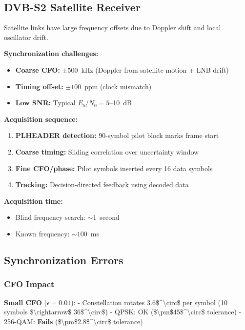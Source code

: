 \subsection{DVB-S2 Satellite Receiver}

Satellite links have large frequency offsets due to Doppler shift and local oscillator drift.

\textbf{Synchronization challenges:}
\begin{itemize}
\item \textbf{Coarse CFO:} $\pm 500$~kHz (Doppler from satellite motion + LNB drift)
\item \textbf{Timing offset:} $\pm 100$~ppm (clock mismatch)
\item \textbf{Low SNR:} Typical $E_b/N_0 = 5$--10~dB
\end{itemize}

\textbf{Acquisition sequence:}
\begin{enumerate}
\item \textbf{PLHEADER detection:} 90-symbol pilot block marks frame start
\item \textbf{Coarse timing:} Sliding correlation over uncertainty window
\item \textbf{Fine CFO/phase:} Pilot symbols inserted every 16 data symbols
\item \textbf{Tracking:} Decision-directed feedback using decoded data
\end{enumerate}

\textbf{Acquisition time:}
\begin{itemize}
\item Blind frequency search: $\sim 1$~second
\item Known frequency: $\sim 100$~ms
\end{itemize}

\subsection{Synchronization Errors}\label{synchronization-errors}

\subsubsection{CFO Impact}\label{cfo-impact-1}

\textbf{Small CFO} (\(\epsilon = 0.01\)): - Constellation rotates
3.6\$\^{}\textbackslash circ\$ per symbol (10 symbols
\$\textbackslash rightarrow\$ 36\$\^{}\textbackslash circ\$) - QPSK: OK
(\$\textbackslash pm\$45\$\^{}\textbackslash circ\$ tolerance) -
256-QAM: \textbf{Fails}
(\$\textbackslash pm\$2.8\$\^{}\textbackslash circ\$ tolerance)

